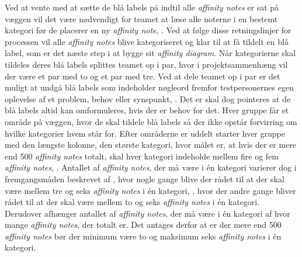 %
Ved at vente med at sætte de blå labels på indtil alle \textit{affinity notes} er sat på væggen vil det være nødvendigt for teamet at læse alle noterne i en bestemt kategori før de placerer en ny \textit{affinity note}, \parencite[s. 169]{Book:BuildingAnAffinity}. Ved at følge disse retningslinjer for processen vil alle \textit{affinity notes} blive kategoriseret og klar til at få tildelt en blå label, som er det næste step i at bygge sit \textit{affinity diagram}. \blankline
%
Når kategorierne skal tildeles deres blå labels 	splittes teamet op i par, hvor i projektsammenhæng vil der være et par med to og et par med tre. Ved at dele teamet op i par er det muligt at undgå blå labels som indeholder nøgleord fremfor testpersonernes egen oplevelse af et problem, behov eller synspunkt, \parencite[s. 170]{Book:BuildingAnAffinity}. Det er skal dog pointeres at de blå labels altid kan omformuleres, hvis der er behov for det. Hver gruppe får et område på væggen, hvor de skal tildele blå labels så der ikke opstår forvirring om hvilke kategorier hvem står for. Efter områderne er uddelt starter hver gruppe med den længste kolonne, den største kategori, hvor målet er, at hvis der er mere end 500 \textit{affinity notes} totalt, skal hver kategori indeholde mellem fire og fem \textit{affinity notes}, \parencite[s. 170]{Book:BuildingAnAffinity}. Antallet af \textit{affinity notes}, der må være i én kategori varierer dog i fremgangsmåden beskrevet af \textcite[ss. 159-179]{Book:BuildingAnAffinity}, hvor nogle gange blive der rådet til at der skal være mellem tre og seks \textit{affinity notes} i én kategori, \parencite[s. 167]{Book:BuildingAnAffinity}, hvor der andre gange bliver rådet til at der skal være mellem to og seks \textit{affinity notes} i én kategori. Derudover afhænger antallet af \textit{affinity notes}, der må være i én kategori af hvor mange \textit{affinity notes}, der totalt er. Det antages derfor at er der mere end 500 \textit{affinity notes} bør der minimum være to og maksimum seks \textit{affinity notes} i én kategori. 

